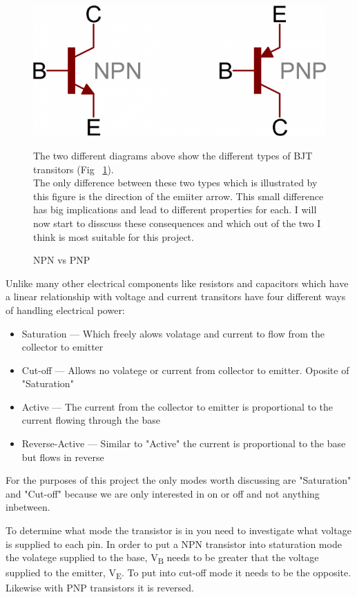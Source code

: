 \documentclass{article}
\begin{document}
\begin{figure}
    \includegraphics{pictures/npn-pnp-symbols.png}
    \caption{NPN vs PNP} \label{fig:different-transitor-layout}
    \vspace{0.5cm}

    The two different diagrams above show the different types of BJT transitors
    (Fig ~\ref{fig:different-transitor-layout}). \\

    The only difference between these two types which is illustrated by this figure is the direction of the 
    emiiter arrow. This small difference has big implications and lead to different properties for each. I
    will now start to disscuss these consequences and which out of the two I think is most suitable for this
    project.

\end{figure}

\break 

Unlike many other electrical components like resistors and capacitors which have a linear relationship with 
voltage and current transitors have four different ways of handling electrical power:

\begin{itemize}
    \item Saturation     --- Which freely alows volatage and current to flow from the collector to emitter
    \item Cut-off        --- Allows no volatege or current from collector to emitter. Oposite of "Saturation"
    \item Active         --- The current from the collector to emitter is proportional to the current flowing
        through the base
    \item Reverse-Active --- Similar to "Active" the current is proportional to the base but flows in reverse
\end{itemize}

For the purposes of this project the only modes worth discussing are "Saturation" and "Cut-off" because we
are only interested in on or off and not anything inbetween. 

To determine what mode the transistor is in you need to investigate what voltage is supplied to each pin.
In order to put a NPN transistor into staturation mode the volatege supplied to the base, V\textsubscript{B}
needs to be greater that the voltage supplied to the emitter, V\textsubscript{E}. To put into cut-off mode
it needs to be the opposite. Likewise with PNP transistors it is reversed.
\end{document}
